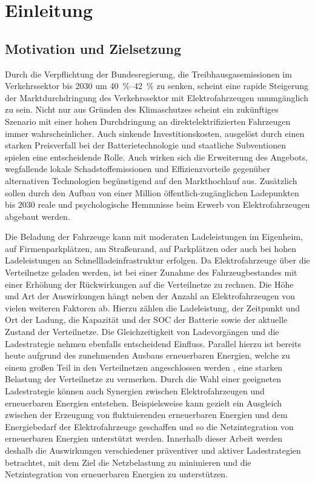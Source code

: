 \section{Einleitung}


\subsection{Motivation und Zielsetzung}

Durch die Verpflichtung der Bundesregierung, die Treibhausgasemissionen im Verkehrssektor bis \num{2030} um \SIrange[range-phrase=~bis~]{40}{42}{\percent} \cite{BundesministeriumUmwelt2019} zu senken, scheint eine rapide Steigerung der Marktdurchdringung des Verkehrssektor mit Elektrofahrzeugen unumgänglich zu sein.
Nicht nur aus Gründen des Klimaschutzes scheint ein zukünftiges Szenario mit einer hohen Durchdringung an direktelektrifizierten Fahrzeugen immer wahrscheinlicher.
Auch sinkende Investitionskosten, ausgelöst durch einen starken Preisverfall bei der Batterietechnologie und staatliche Subventionen spielen eine entscheidende Rolle.
Auch wirken sich die Erweiterung des Angebots, wegfallende lokale Schadstoffemissionen und Effizienzvorteile gegenüber alternativen Technologien begünstigend auf den Markthochlauf aus.
Zusätzlich sollen durch den Aufbau von einer Million öffentlich-zugänglichen Ladepunkten bis \num{2030} \cite{DieBundesregierung2019} reale und psychologische Hemmnisse beim Erwerb von Elektrofahrzeugen abgebaut werden.\medskip

Die Beladung der Fahrzeuge kann mit moderaten Ladeleistungen im Eigenheim, auf Firmenparkplätzen, am Straßenrand, auf Parkplätzen oder auch bei hohen Ladeleistungen an Schnellladeinfrastruktur erfolgen.
Da Elektrofahrzeuge über die Verteilnetze geladen werden, ist bei einer Zunahme des Fahrzeugbestandes mit einer Erhöhung der Rückwirkungen auf die Verteilnetze zu rechnen.
Die Höhe und Art der Auswirkungen hängt neben der Anzahl an Elektrofahrzeugen von vielen weiteren Faktoren ab.
Hierzu zählen die Ladeleistung, der Zeitpunkt und Ort der Ladung, die Kapazität und der \gls{SOC} der Batterie sowie der aktuelle Zustand der Verteilnetze.
Die Gleichzeitigkeit von Ladevorgängen und die Ladestrategie nehmen ebenfalls entscheidend Einfluss.
Parallel hierzu ist bereits heute aufgrund des zunehmenden Ausbaus erneuerbaren Energien, welche zu einem großen Teil in den Verteilnetzen angeschlossen werden \cite{AgoraEnergiewende2017}, eine starken Belastung der Verteilnetze zu vermerken.
Durch die Wahl einer geeigneten Ladestrategie können auch Synergien zwischen Elektrofahrzeugen und erneuerbaren Energien entstehen.
Beispielsweise kann gezielt ein Ausgleich zwischen der Erzeugung von fluktuierenden erneuerbaren Energien und dem Energiebedarf der Elektrofahrzeuge geschaffen und so die Netzintegration von erneuerbaren Energien unterstützt werden.
Innerhalb dieser Arbeit werden deshalb die Auswirkungen verschiedener präventiver und aktiver Ladestrategien betrachtet, mit dem Ziel die Netzbelastung zu minimieren und die Netzintegration von erneuerbaren Energien zu unterstützen.\medskip

